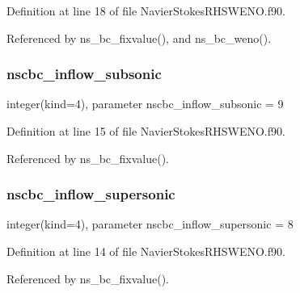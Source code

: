 Definition at line 18 of file Navier\+Stokes\+R\+H\+S\+W\+E\+N\+O.\+f90.



Referenced by ns\+\_\+bc\+\_\+fixvalue(), and ns\+\_\+bc\+\_\+weno().

\hypertarget{namespacenavierstokesrhsweno_a107aa9ceb3e9d2a5a94105422ed2ba17}{}\label{namespacenavierstokesrhsweno_a107aa9ceb3e9d2a5a94105422ed2ba17} 
\subsubsection{\texorpdfstring{nscbc\+\_\+inflow\+\_\+subsonic}{nscbc\_inflow\_subsonic}}
{\footnotesize\ttfamily integer(kind=4), parameter nscbc\+\_\+inflow\+\_\+subsonic = 9}



Definition at line 15 of file Navier\+Stokes\+R\+H\+S\+W\+E\+N\+O.\+f90.



Referenced by ns\+\_\+bc\+\_\+fixvalue().

\hypertarget{namespacenavierstokesrhsweno_a38d8dd65816be04f23b62b1a44902ad2}{}\label{namespacenavierstokesrhsweno_a38d8dd65816be04f23b62b1a44902ad2} 
\subsubsection{\texorpdfstring{nscbc\+\_\+inflow\+\_\+supersonic}{nscbc\_inflow\_supersonic}}
{\footnotesize\ttfamily integer(kind=4), parameter nscbc\+\_\+inflow\+\_\+supersonic = 8}



Definition at line 14 of file Navier\+Stokes\+R\+H\+S\+W\+E\+N\+O.\+f90.



Referenced by ns\+\_\+bc\+\_\+fixvalue().

\hypertarget{namespacenavierstokesrhsweno_a5be437968972476e91d15252df952b44}{}\label{namespacenavierstokesrhsweno_a5be437968972476e91d15252df952b44} 
